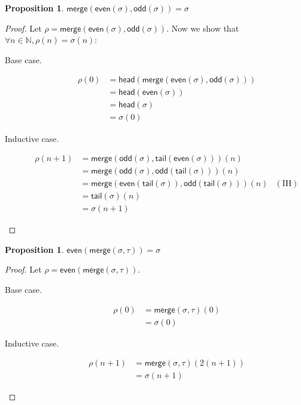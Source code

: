 \documentclass{article}
\newcommand{\natN}{\mathbb{N}}
\newcommand{\odd}{\mathsf{odd}}
\newcommand{\even}{\mathsf{even}}
\newcommand{\merge}{\mathsf{merge}}
\newcommand{\head}{\mathsf{head}}
\newcommand{\tail}{\mathsf{tail}}
\newtheorem{proposition}[theorem]{Proposition}
\theoremstyle{definition}
\theoremstyle{definition}
\begin{document}
\begin{proposition}
$ \merge(\even(\sigma), \odd(\sigma)) = \sigma $
\end{proposition}
\begin{proof}
Let $\rho = \merge(\even(\sigma), \odd(\sigma))$.
Now we show that $\forall n \in \natN, \rho(n) = \sigma(n) $:
\begin{description}
    \item[Base case.] 
    \begin{align*}
        \rho(0) & = \head(\merge(\even(\sigma), \odd(\sigma))) \\
        & = \head(\even(\sigma)) \\
        & = \head(\sigma) \\
        & = \sigma(0)
    \end{align*}
    \item[Inductive case.]
     \begin{align*}
        \rho(n+1) & =  \merge(\odd(\sigma), \tail(\even(\sigma)))(n) \\
        & =  \merge(\odd(\sigma), \odd(\tail(\sigma)))(n) \\
        & = \merge( \even(\tail(\sigma)), \odd(\tail(\sigma)) )(n) & (\text{IH}) \\
        & = \tail(\sigma)(n) \\
        & = \sigma(n+1)
    \end{align*}
\end{description}
    
\end{proof}

\begin{proposition}
$ \even(\merge(\sigma, \tau)) = \sigma $
\end{proposition}
\begin{proof}
Let $\rho = \even(\merge(\sigma, \tau))$.
\begin{description}
    \item[Base case.] 
    \begin{align*}
        \rho(0) & = \merge(\sigma, \tau)(0) \\
        & = \sigma(0) 
    \end{align*}
    \item[Inductive case.]
     \begin{align*}
        \rho(n+1) & =  \merge(\sigma, \tau)(2(n + 1)) \\
        & =  \sigma(n+1) 
    \end{align*}
\end{description}
\end{proof}
\end{document}
